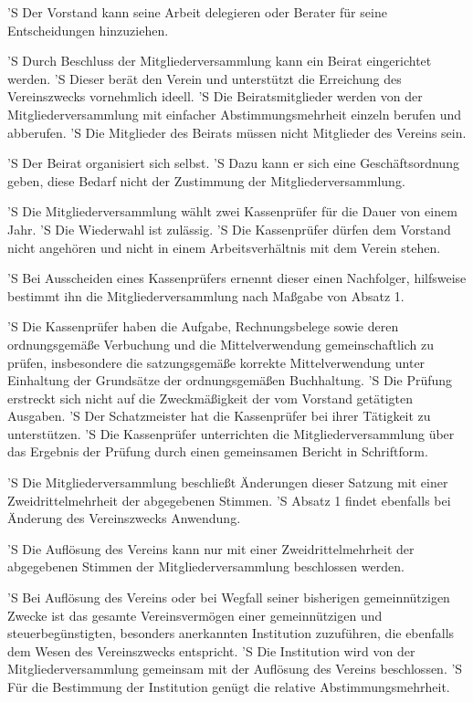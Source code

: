 \documentclass[a4paper,10pt]{scrreprt}
\begin{document}
\begin{contract}
'S Der Vorstand kann seine Arbeit delegieren oder Berater für seine
Entscheidungen hinzuziehen.


'S Durch Beschluss der Mitgliederversammlung kann ein Beirat eingerichtet
werden.
'S Dieser berät den Verein und unterstützt die Erreichung des Vereinszwecks
vornehmlich ideell.
'S Die Beiratsmitglieder werden von der Mitgliederversammlung mit einfacher
Abstimmungsmehrheit einzeln berufen und abberufen.
'S Die Mitglieder des Beirats müssen nicht Mitglieder des Vereins sein.

'S Der Beirat organisiert sich selbst.
'S Dazu kann er sich eine Geschäftsordnung geben, diese Bedarf nicht der
Zustimmung der Mitgliederversammlung.


'S Die Mitgliederversammlung wählt zwei Kassenprüfer für die Dauer von einem
Jahr.
'S Die Wiederwahl ist zulässig.
'S Die Kassenprüfer dürfen dem Vorstand nicht angehören und nicht in einem
Arbeitsverhältnis mit dem Verein stehen.

'S Bei Ausscheiden eines Kassenprüfers ernennt dieser einen Nachfolger,
hilfsweise bestimmt ihn die Mitgliederversammlung nach Maßgabe von Absatz 1.

'S Die Kassenprüfer haben die Aufgabe, Rechnungsbelege sowie deren
ordnungsgemäße Verbuchung und die Mittelverwendung gemeinschaftlich zu prüfen,
insbesondere die satzungsgemäße korrekte Mittelverwendung unter Einhaltung der
Grundsätze der ordnungsgemäßen Buchhaltung.
'S Die Prüfung erstreckt sich nicht auf die Zweckmäßigkeit der vom Vorstand
getätigten Ausgaben.
'S Der Schatzmeister hat die Kassenprüfer bei ihrer Tätigkeit zu unterstützen.
'S Die Kassenprüfer unterrichten die Mitgliederversammlung über das Ergebnis
der Prüfung durch einen gemeinsamen Bericht in Schriftform.


'S Die Mitgliederversammlung beschließt Änderungen dieser Satzung mit einer
Zweidrittelmehrheit der abgegebenen Stimmen.
'S Absatz 1 findet ebenfalls bei Änderung des Vereinszwecks Anwendung.


'S Die Auflösung des Vereins kann nur mit einer Zweidrittelmehrheit der
abgegebenen Stimmen der Mitgliederversammlung beschlossen werden.

'S Bei Auflösung des Vereins oder bei Wegfall seiner bisherigen gemeinnützigen
Zwecke ist das gesamte Vereinsvermögen einer gemeinnützigen und
steuerbegünstigten, besonders anerkannten Institution zuzuführen, die ebenfalls
dem Wesen des Vereinszwecks entspricht.
'S Die Institution wird von der Mitgliederversammlung gemeinsam mit der
Auflösung des Vereins beschlossen.
'S Für die Bestimmung der Institution genügt die relative Abstimmungsmehrheit.


\end{contract}
\end{document}
